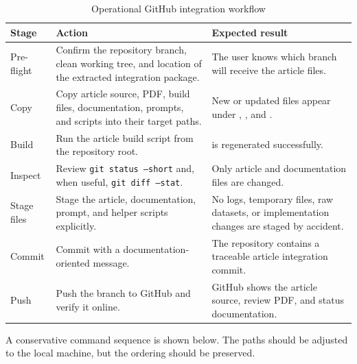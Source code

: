 \documentclass[11pt,a4paper]{article}
\begin{document}
\begin{table}[H]
\centering
\caption{Operational GitHub integration workflow}
\label{tab:github-workflow}
\begin{tabularx}{\textwidth}{L{3.2cm}Y Y}
\toprule
\textbf{Stage} & \textbf{Action} & \textbf{Expected result} \\
\midrule
Pre-flight & Confirm the repository branch, clean working tree, and location of the extracted integration package. & The user knows which branch will receive the article files. \\
Copy & Copy article source, PDF, build files, documentation, prompts, and scripts into their target paths. & New or updated files appear under , , and . \\
Build & Run the article build script from the repository root. &  is regenerated successfully. \\
Inspect & Review \texttt{git status --short} and, when useful, \texttt{git diff --stat}. & Only article and documentation files are changed. \\
Stage files & Stage the article, documentation, prompt, and helper scripts explicitly. & No logs, temporary files, raw datasets, or implementation changes are staged by accident. \\
Commit & Commit with a documentation-oriented message. & The repository contains a traceable article integration commit. \\
Push & Push the branch to GitHub and verify it online. & GitHub shows the article source, review PDF, and status documentation. \\
\bottomrule
\end{tabularx}
\end{table}

A conservative command sequence is shown below. The paths should be adjusted to the local machine, but the ordering should be preserved.
\end{document}
